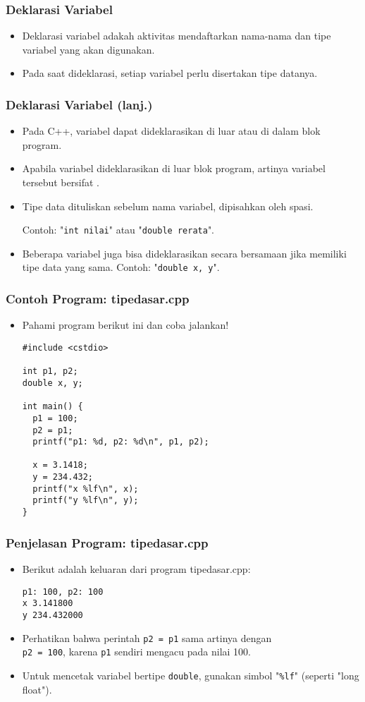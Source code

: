 \begin{frame}
\frametitle{Deklarasi Variabel}
\begin{itemize}
  \item Deklarasi variabel adakah aktivitas mendaftarkan nama-nama dan tipe variabel yang akan digunakan.
  \item Pada saat dideklarasi, setiap variabel perlu disertakan tipe datanya.
\end{itemize}
\end{frame}

\begin{frame}
\frametitle{Deklarasi Variabel (lanj.)}
\begin{itemize}
  \item Pada C++, variabel dapat dideklarasikan di luar atau di dalam blok program.
  \item Apabila variabel dideklarasikan di luar blok program, artinya variabel tersebut bersifat .
  \item Tipe data dituliskan sebelum nama variabel, dipisahkan oleh spasi.

  Contoh: "\texttt{int nilai}" atau "\texttt{double rerata}".
  \item Beberapa variabel juga bisa dideklarasikan secara bersamaan jika memiliki tipe data yang sama. Contoh: "\texttt{double x, y}".
\end{itemize}
\end{frame}


\begin{frame}[fragile]
\frametitle{Contoh Program: tipedasar.cpp}
\begin{itemize}
  \item Pahami program berikut ini dan coba jalankan!
\begin{lstlisting}
#include <cstdio>

int p1, p2;
double x, y;

int main() {
  p1 = 100;
  p2 = p1;
  printf("p1: %d, p2: %d\n", p1, p2);

  x = 3.1418;
  y = 234.432;
  printf("x %lf\n", x);
  printf("y %lf\n", y);
}
\end{lstlisting}
\end{itemize}
\end{frame}

\begin{frame}[fragile]
\frametitle{Penjelasan Program: tipedasar.cpp}
\begin{itemize}
  \item Berikut adalah keluaran dari program tipedasar.cpp:
\begin{lstlisting}
p1: 100, p2: 100
x 3.141800
y 234.432000
\end{lstlisting}
  \item Perhatikan bahwa perintah \texttt{p2 = p1} sama artinya dengan \\ \texttt{p2 = 100}, karena \texttt{p1} sendiri mengacu pada nilai 100.
  \item Untuk mencetak variabel bertipe \texttt{double}, gunakan simbol "\texttt{\%lf}" (seperti "long float").
\end{itemize}
\end{frame}

